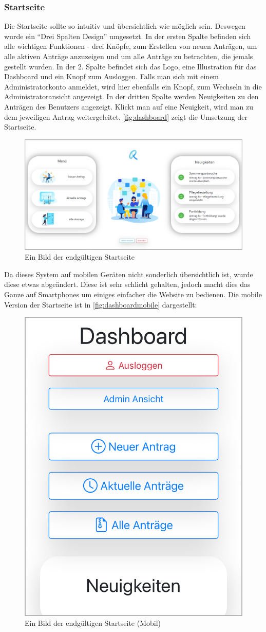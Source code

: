 \subsubsection{Startseite}
\label{chapter:implementierung-frontend-komponenten-startseite}
Die Startseite sollte so intuitiv und übersichtlich wie möglich sein. Deswegen wurde ein \enquote{Drei Spalten Design} umgesetzt. In der ersten Spalte befinden sich alle wichtigen Funktionen - drei Knöpfe, zum Erstellen von neuen Anträgen, um alle aktiven Anträge anzuzeigen und um alle Anträge zu betrachten, die jemals gestellt wurden. In der 2. Spalte befindet sich das Logo, eine Illustration für das Dashboard und ein Knopf zum Ausloggen. Falls man sich mit einem Administratorkonto anmeldet, wird hier ebenfalls ein Knopf, zum Wechseln in die Administratoransicht angezeigt. In der dritten Spalte werden Neuigkeiten zu den Anträgen des Benutzers angezeigt. Klickt man auf eine Neuigkeit, wird man zu dem jeweiligen Antrag weitergeleitet. \autoref{fig:dashboard} zeigt die Umsetzung der Startseite.
\begin{figure}[H]
	\centering
	\includegraphics[width=1\linewidth]{images/ldehner_implementierung/dashboard}
	\caption[Dashboard Seite]{Ein Bild der endgültigen Startseite}
	\label{fig:dashboard}
\end{figure}
Da dieses System auf mobilen Geräten nicht sonderlich übersichtlich ist, wurde diese etwas abgeändert. Diese ist sehr schlicht gehalten, jedoch macht dies das Ganze auf Smartphones um einiges einfacher die Website zu bedienen. Die mobile Version der Startseite ist in \autoref{fig:dashboardmobile} dargestellt:
\begin{figure}[H]
	\centering
	\includegraphics[width=0.4\linewidth]{images/ldehner_implementierung/dashboard_mobile}
	\caption[Dashboard Mobil Seite]{Ein Bild der endgültigen Startseite (Mobil)}
	\label{fig:dashboardmobile}
\end{figure}

